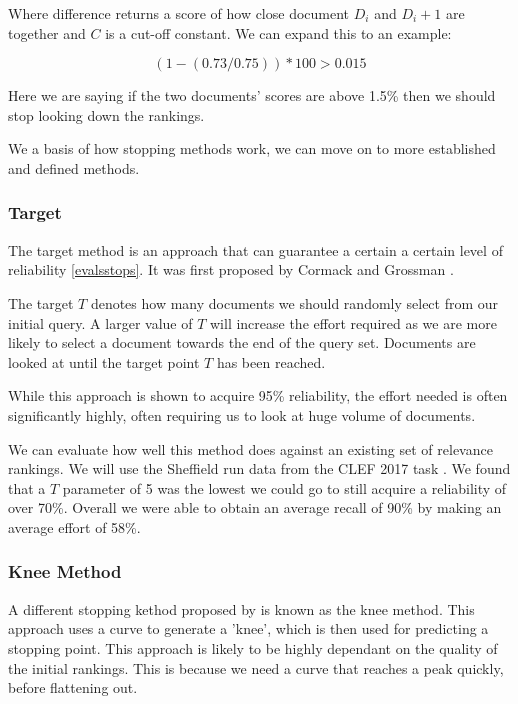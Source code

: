 Where difference returns a score of how close document $D_i$ and $D_i+1$ are together and $C$ is a cut-off constant. We can expand this to an example:

\begin{equation}
	  (1 -(0.73 / 0.75)) * 100 > 0.015
\end{equation}

Here we are saying if the two documents' scores are above 1.5\% then we should stop looking down the rankings.

We a basis of how stopping methods work, we can move on to more established and defined methods.


\subsubsection{Target} \label{target}

The target method is an approach that can guarantee a certain a certain level of reliability \ref{evalsstops}. It was first proposed by Cormack and Grossman \cite{Cormack2016}.

The target $T$ denotes how many documents we should randomly select from our initial query. A larger value of $T$ will increase the effort required as we are more likely to select a document towards the end of the query set. Documents are looked at until the target point $T$ has been reached.

While this approach is shown to acquire 95\% reliability, the effort needed is often significantly highly, often requiring us to look at huge volume of documents.

We can evaluate how well this method does against an existing set of relevance rankings. We will use the Sheffield run data from the CLEF 2017 task \cite{Kanoulas12017}. We found that a $T$ parameter of 5 was the lowest we could go to still acquire a reliability of over 70\%. Overall we were able to obtain an average recall of 90\% by making an average effort of 58\%.

\subsubsection{Knee Method}

A different stopping kethod proposed by \cite{Satopa11} is known as the knee method. This approach uses a curve to generate a 'knee', which is then used for predicting a stopping point. This approach is likely to be highly dependant on the quality of the initial rankings. This is because we need a curve that reaches a peak quickly, before flattening out.

